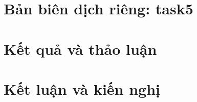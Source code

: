 \documentclass[13pt,a4paper,oneside]{extreport}
\begin{document}
\chapter*{Bản biên dịch riêng: task5}
\chapter{Kết quả và thảo luận}

\chapter{Kết luận và kiến nghị}

\printbibliography
\end{document}
